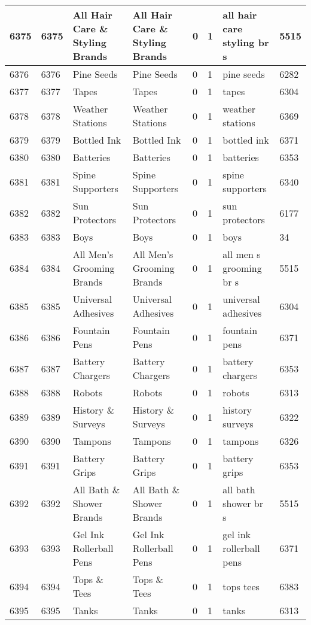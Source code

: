 \begin{longtable}{|l|l|l|l|l|l|l|l|}
6375 & 6375 & All Hair Care \& Styling Brands & All Hair Care \& Styling Brands & 0 & 1 & all hair care styling br s & 5515 \\ \hline 
6376 & 6376 & Pine Seeds & Pine Seeds & 0 & 1 & pine seeds & 6282 \\ \hline 
6377 & 6377 & Tapes & Tapes & 0 & 1 & tapes & 6304 \\ \hline 
6378 & 6378 & Weather Stations & Weather Stations & 0 & 1 & weather stations & 6369 \\ \hline 
6379 & 6379 & Bottled Ink & Bottled Ink & 0 & 1 & bottled ink & 6371 \\ \hline 
6380 & 6380 & Batteries & Batteries & 0 & 1 & batteries & 6353 \\ \hline 
6381 & 6381 & Spine Supporters & Spine Supporters & 0 & 1 & spine supporters & 6340 \\ \hline 
6382 & 6382 & Sun Protectors & Sun Protectors & 0 & 1 & sun protectors & 6177 \\ \hline 
6383 & 6383 & Boys & Boys & 0 & 1 & boys & 34 \\ \hline 
6384 & 6384 & All Men's Grooming Brands & All Men's Grooming Brands & 0 & 1 & all men s grooming br s & 5515 \\ \hline 
6385 & 6385 & Universal Adhesives & Universal Adhesives & 0 & 1 & universal adhesives & 6304 \\ \hline 
6386 & 6386 & Fountain Pens & Fountain Pens & 0 & 1 & fountain pens & 6371 \\ \hline 
6387 & 6387 & Battery Chargers & Battery Chargers & 0 & 1 & battery chargers & 6353 \\ \hline 
6388 & 6388 & Robots & Robots & 0 & 1 & robots & 6313 \\ \hline 
6389 & 6389 & History \& Surveys & History \& Surveys & 0 & 1 & history surveys & 6322 \\ \hline 
6390 & 6390 & Tampons & Tampons & 0 & 1 & tampons & 6326 \\ \hline 
6391 & 6391 & Battery Grips & Battery Grips & 0 & 1 & battery grips & 6353 \\ \hline 
6392 & 6392 & All Bath \& Shower Brands & All Bath \& Shower Brands & 0 & 1 & all bath shower br s & 5515 \\ \hline 
6393 & 6393 & Gel Ink Rollerball Pens & Gel Ink Rollerball Pens & 0 & 1 & gel ink rollerball pens & 6371 \\ \hline 
6394 & 6394 & Tops \& Tees & Tops \& Tees & 0 & 1 & tops tees & 6383 \\ \hline 
6395 & 6395 & Tanks & Tanks & 0 & 1 & tanks & 6313 \\ \hline 

\end{longtable}
